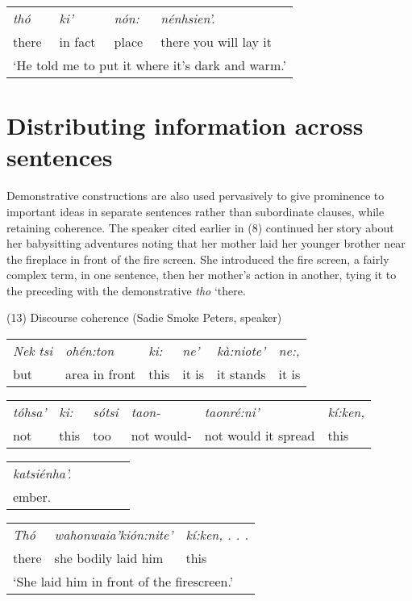 \documentclass[output=paper,colorlinks,citecolor=brown
]{langscibook}
\begin{document}
\begin{tabular}{llll}
\emph{thó} &  \emph{ki'} & \emph{nón:} & \emph{nénhsien'.}\\
there & in fact & place & there you will lay it\\
\multicolumn{4}{l}{`He told me to put it where it's dark and warm.'}
\end{tabular}\bigskip

\section{Distributing information across sentences}

Demonstrative constructions are also used pervasively to give prominence to important ideas in separate sentences rather than subordinate clauses, while retaining coherence. The speaker cited earlier in (8) continued her story about her babysitting adventures noting that her mother laid her younger brother near the fireplace in front of the fire screen. She introduced the fire screen, a fairly complex term, in one sentence, then her mother's action in another, tying it to the preceding with the demonstrative \emph{tho} `there.\bigskip

(13) Discourse coherence (Sadie Smoke Peters, speaker)\\

\begin{tabular}{llllll}

\emph{Nek tsi} & \emph{ohén:ton} & \emph{ki:} & \emph{ne'} & \emph{kà:niote'} & \emph{ne:,}\\

but & area in front & this & it is & it stands & it is
\end{tabular}\bigskip

\begin{tabular}{llllll}
\emph{tóhsa'} & \emph{ki:} & \emph{sótsi} & \emph{taon-} & \emph{taonré:ni'} & \emph{kí:ken,}\\

not & this &  too & not would-&  not would it spread & this
\end{tabular}\bigskip

\begin{tabular}{lllll}
\emph{katsiénha'.}\\

ember.
\end{tabular}\bigskip

\begin{tabular}{lll}
\emph{Thó} & \emph{wahonwaia'kión:nite'} & \emph{kí:ken, . . .}\\

there & she bodily laid him & this\\
\multicolumn{3}{l}{`She laid him in front of the firescreen.'}
\end{tabular}\bigskip
\end{document}
